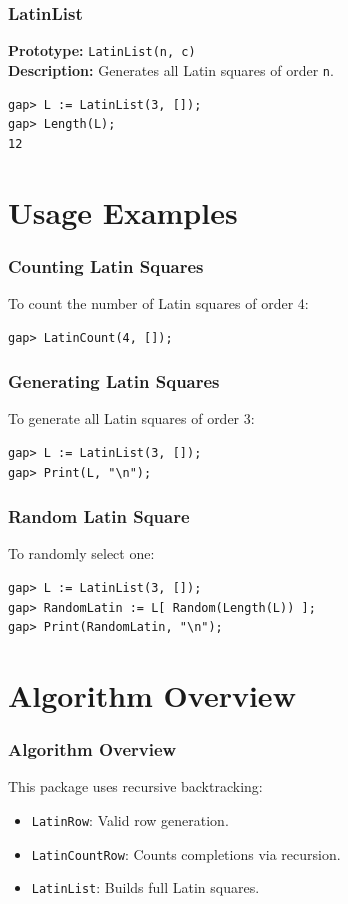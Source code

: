 \documentclass{beamer}
\begin{document}
\begin{frame}[fragile]
\frametitle{LatinList}
\textbf{Prototype:} \texttt{LatinList(n, c)}\\
\textbf{Description:} Generates all Latin squares of order \texttt{n}.
\begin{lstlisting}
gap> L := LatinList(3, []);
gap> Length(L);
12
\end{lstlisting}
\end{frame}

\section{Usage Examples}
\begin{frame}[fragile]
\frametitle{Counting Latin Squares}
To count the number of Latin squares of order 4:
\begin{lstlisting}
gap> LatinCount(4, []);
\end{lstlisting}
\end{frame}

\begin{frame}[fragile]
\frametitle{Generating Latin Squares}
To generate all Latin squares of order 3:
\begin{lstlisting}
gap> L := LatinList(3, []);
gap> Print(L, "\n");
\end{lstlisting}
\end{frame}

\begin{frame}[fragile]
\frametitle{Random Latin Square}
To randomly select one:
\begin{lstlisting}
gap> L := LatinList(3, []);
gap> RandomLatin := L[ Random(Length(L)) ];
gap> Print(RandomLatin, "\n");
\end{lstlisting}
\end{frame}

\section{Algorithm Overview}
\begin{frame}
\frametitle{Algorithm Overview}
This package uses recursive backtracking:
\begin{itemize}
  \item \texttt{LatinRow}: Valid row generation.
  \item \texttt{LatinCountRow}: Counts completions via recursion.
  \item \texttt{LatinList}: Builds full Latin squares.
\end{itemize}
\end{frame}
\end{document}
